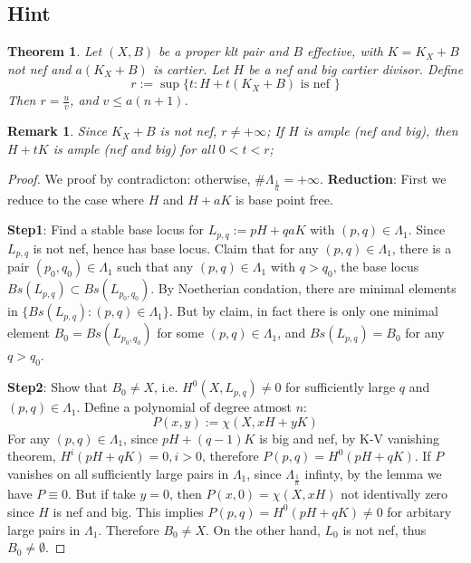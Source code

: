 \documentclass{article}
\newtheorem{thm}[defn]{Theorem}
\newtheorem{rmk}[defn]{Remark}
\begin{document}
\subsection{Hint}
\begin{thm}
  Let $ (X,B) $ be a proper klt pair and $ B $ effective, with $ K=K_X+B $ not nef and $ a(K_X+B) $ is cartier.  Let $ H $ be a nef and big cartier divisor. Define 
  \[ r:=\sup \{t: H+t(K_X+B) \text{ is nef }\} \]
  Then $ r=\frac{u}{v} $, and $ v\leqslant a(n+1) $.
\end{thm}
\begin{rmk}
  Since $ K_X+B $ is not nef, $ r\neq +\infty $; If $ H $ is ample (nef and big), then $ H+tK $ is ample (nef and big) for all $ 0<t<r $;
\end{rmk}
\begin{proof}
  We proof by contradicton: otherwise, $\# \Lambda_{\frac{1}{n}}=+\infty $. \textbf{Reduction}: First we reduce to the case where  $ H $ and $ H+aK $ is base point free.
  
  \textbf{Step1}: Find a stable base locus for $ L_{p,q}:=pH+qaK $ with $ (p,q)\in \Lambda_1 $. Since $ L_{p,q} $ is  not nef, hence has base locus. Claim that for any $ (p,q)\in \Lambda_1 $, there is  a pair $ (p_0,q_0)\in \Lambda_1 $ such that any $ (p,q)\in \Lambda_1$ with $ q>q_0 $, the base locus $ Bs(L_{p,q})\subset Bs(L_{p_0,q_0}) $. By Noetherian condation, there are minimal elements in $ \{Bs(L_{p,q}):(p,q)\in \Lambda_1\} $. But by claim, in fact there is only one minimal element $ B_0=Bs(L_{p_0,q_0}) $ for some $ (p,q)\in \Lambda_1 $, and $ Bs(L_{p,q})=B_0 $ for any $ q>q_0 $.
  
  \textbf{Step2}: Show that $ B_0\neq X $, i.e. $ H^0(X, L_{p,q})\neq 0 $  for sufficiently large $ q $ and $ (p,q)\in \Lambda_1 $. Define a polynomial of degree atmost $ n $:
  \[ P(x,y):=\chi (X,xH+yK) \]
  For any $ (p,q)\in \Lambda_1 $, since $ pH+(q-1)K $ is big and nef, by K-V vanishing theorem, $ H^i(pH+qK)=0, i>0 $, therefore $ P(p,q)=H^0(pH+qK) $. If $ P $ vanishes on all sufficiently large pairs in $ \Lambda_1 $, since $ \Lambda_{\frac{1}{n}} $ infinty, by the lemma we have $ P\equiv 0 $. But if take $ y=0 $, then $ P(x,0)=\chi (X,xH) $ not identivally zero since $ H $ is nef and big. This implies $ P(p,q)=H^0(pH+qK)\neq 0 $ for arbitary large pairs in $ \Lambda_1$. Therefore $ B_0\neq X $. On the other hand, $ L_0 $ is not nef, thus $ B_0\neq \emptyset $.
  

\end{proof}
\end{document}
